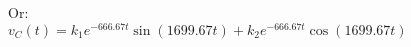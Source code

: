 \documentclass[preview]{standalone}
\begin{document}
\begin{center}
Or: \\
                                $v_C(t) = k_1e^{-666.67t}\sin(1699.67t) + k_2e^{-666.67t}\cos(1699.67t)$
\end{center}
\end{document}

